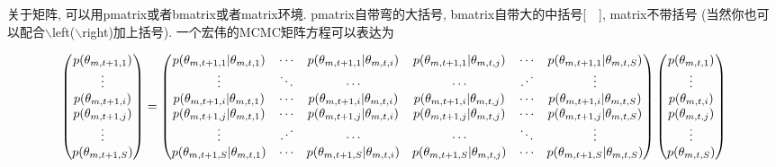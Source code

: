 \documentclass[a4paper]{article}
\begin{document}
\begin{spacing}{1.5}
关于矩阵, 可以用pmatrix或者bmatrix或者matrix环境. pmatrix自带弯的大括号, bmatrix自带大的中括号[\ \ ], matrix不带括号 (当然你也可以配合$\backslash$left($\backslash$right)加上括号). 一个宏伟的MCMC矩阵方程可以表达为
\begin{small}
\begin{equation}\label{MCMC_equation}
\begin{pmatrix}
p(\theta_{m,t+1,1})\\
\vdots\\
p(\theta_{m,t+1,i})\\
p(\theta_{m,t+1,j})\\
\vdots\\
p(\theta_{m,t+1,S})\\
\end{pmatrix}
=
\begin{pmatrix}
p(\theta_{m,t+1,1}|\theta_{m,t,1})&\cdots&p(\theta_{m,t+1,1}|\theta_{m,t,i})&p(\theta_{m,t+1,1}|\theta_{m,t,j})&\cdots&p(\theta_{m,t+1,1}|\theta_{m,t,S})\\
\vdots&\ddots&\cdots&\cdots&{\mathinner{\mkern2mu\raise1pt\hbox{.}\mkern2mu \raise4pt\hbox{.}\mkern2mu\raise7pt\hbox{.}\mkern1mu}}&\vdots\\
p(\theta_{m,t+1,i}|\theta_{m,t,1})&\cdots&p(\theta_{m,t+1,i}|\theta_{m,t,i})&p(\theta_{m,t+1,i}|\theta_{m,t,j})&\cdots&p(\theta_{m,t+1,i}|\theta_{m,t,S})\\
p(\theta_{m,t+1,j}|\theta_{m,t,1})&\cdots&p(\theta_{m,t+1,j}|\theta_{m,t,i})&p(\theta_{m,t+1,j}|\theta_{m,t,j})&\cdots&p(\theta_{m,t+1,j}|\theta_{m,t,S})\\
\vdots&{\mathinner{\mkern2mu\raise1pt\hbox{.}\mkern2mu \raise4pt\hbox{.}\mkern2mu\raise7pt\hbox{.}\mkern1mu}}&\cdots&\cdots&\ddots&\vdots\\
p(\theta_{m,t+1,S}|\theta_{m,t,1})&\cdots&p(\theta_{m,t+1,S}|\theta_{m,t,i})&p(\theta_{m,t+1,S}|\theta_{m,t,j})&\cdots&p(\theta_{m,t+1,S}|\theta_{m,t,S})\\
\end{pmatrix}
\begin{pmatrix}
p(\theta_{m,t,1})\\
\vdots\\
p(\theta_{m,t,i})\\
p(\theta_{m,t,j})\\
\vdots\\
p(\theta_{m,t,S})\\
\end{pmatrix}
\end{equation}
\end{small}


\end{spacing}
\end{document}
